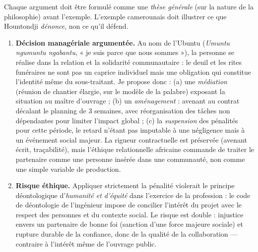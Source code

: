 \documentclass[11pt]{article}
\newcommand{\cle}[1]{{\popxbold\color{popdark}#1}}
\begin{document}
\begin{attention}
Chaque argument doit être formulé comme une \emph{thèse générale} (sur la nature de la philosophie) avant l'exemple. L'exemple camerounais doit illustrer ce que Hountondji \emph{dénonce}, non ce qu'il défend.
\end{attention}

\begin{corrige}
\begin{enumerate}
    \item \textbf{Décision managériale argumentée.} Au nom de l'\cle{Ubuntu} (\emph{Umuntu ngumuntu ngabantu}, « je suis parce que nous sommes »), la personne se réalise dans la relation et la solidarité communautaire : le deuil et les rites funéraires ne sont pas un caprice individuel mais une obligation qui constitue l'identité même du sous-traitant. Je propose donc : (a) une \emph{médiation} (réunion de chantier élargie, sur le modèle de la palabre) exposant la situation au maître d'ouvrage ; (b) un \emph{aménagement} : avenant au contrat décalant le planning de 3 semaines, avec réorganisation des tâches non dépendantes pour limiter l'impact global ; (c) la \emph{suspension} des pénalités pour cette période, le retard n'étant pas imputable à une négligence mais à un événement social majeur. La rigueur contractuelle est préservée (avenant écrit, traçabilité), mais l'éthique relationnelle africaine commande de traiter le partenaire comme une personne insérée dans une communauté, non comme une simple variable de production.
    \item \textbf{Risque éthique.} Appliquer strictement la pénalité violerait le principe déontologique d'\emph{humanité et d'équité} dans l'exercice de la profession : le code de déontologie de l'ingénieur impose de concilier l'intérêt du projet avec le respect des personnes et du contexte social. Le risque est double : injustice envers un partenaire de bonne foi (sanction d'une force majeure sociale) et rupture durable de la confiance, donc de la qualité de la collaboration — contraire à l'intérêt même de l'ouvrage public.
\end{enumerate}
\end{corrige}
\end{document}
